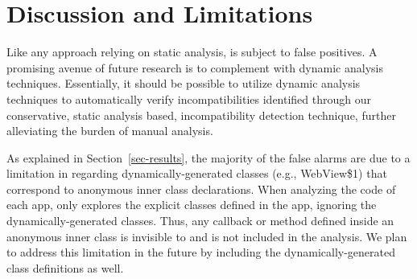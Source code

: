 \section{Discussion and Limitations}\label{sec-discussion}

Like any approach relying on static analysis, \@approach is subject
to false positives. A promising avenue of future research is
to complement \@approach with dynamic analysis techniques.
Essentially, it should be possible to utilize dynamic
analysis techniques to automatically verify
incompatibilities identified through our conservative,
static analysis based, incompatibility detection technique,
further alleviating the burden of manual analysis.

As explained in Section~\ref{sec-results}, the majority of the
false alarms are due to a limitation in \@approach regarding
dynamically-generated classes (e.g., {\sf WebView\$1}) that
correspond to anonymous inner class declarations.  When
analyzing the code of each app, \@approach only explores the
explicit classes defined in the app, ignoring the
dynamically-generated classes. Thus, any callback or method
defined inside an anonymous inner class is invisible to
\@approach and is not included in the analysis. We plan to
address this limitation in the future by including the
dynamically-generated class definitions as well.


